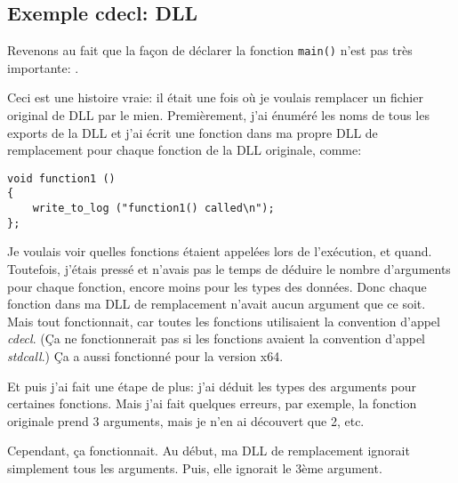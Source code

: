 \subsection{Exemple cdecl: DLL}
\label{cdecl_DLL}

Revenons au fait que la façon de déclarer la fonction \verb|main()| n'est pas très importante: .

Ceci est une histoire vraie: il était une fois où je voulais remplacer un fichier
original de DLL par le mien.
Premièrement, j'ai énuméré les noms de tous les exports de la DLL et j'ai écrit
une fonction dans ma propre DLL de remplacement pour chaque fonction de la DLL
originale, comme:

\begin{lstlisting}[style=customc]
void function1 ()
{
	write_to_log ("function1() called\n");
};
\end{lstlisting}

Je voulais voir quelles fonctions étaient appelées lors de l'exécution, et quand.
Toutefois, j'étais pressé et n'avais pas le temps de déduire le nombre d'arguments
pour chaque fonction, encore moins pour les types des données.
Donc chaque fonction dans ma DLL de remplacement n'avait aucun argument que ce soit.
Mais tout fonctionnait, car toutes les fonctions utilisaient la convention d'appel
\emph{cdecl}.
(Ça ne fonctionnerait pas si les fonctions avaient la convention d'appel \emph{stdcall}.)
Ça a aussi fonctionné pour la version x64.

Et puis j'ai fait une étape de plus: j'ai déduit les types des arguments pour
certaines fonctions.
Mais j'ai fait quelques erreurs, par exemple, la fonction originale prend 3 arguments,
mais je n'en ai découvert que 2, etc.

Cependant, ça fonctionnait.
Au début, ma DLL de remplacement ignorait simplement tous les arguments.
Puis, elle ignorait le 3ème argument.
